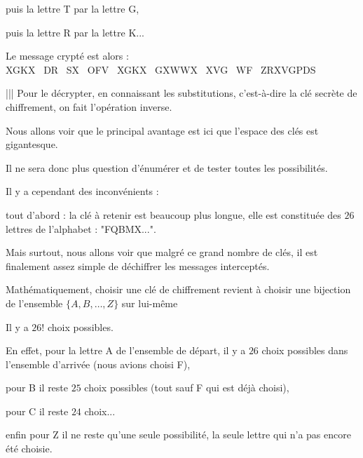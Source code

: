 puis la lettre T par la lettre G, 

puis la lettre R par la lettre K...

\change


Le message crypté est alors : \\
{XGKX \ DR \ SX \ OFV \ XGKX \ GXWWX \ XVG \ WF \ ZRXVGPDS}

\change

||| Pour le décrypter, en connaissant les substitutions, c'est-à-dire la clé secrète de chiffrement, on fait l'opération inverse.

\change

Nous allons voir que le principal avantage est ici que l'espace des clés est gigantesque.

Il ne sera donc plus question d'énumérer et de tester toutes les possibilités.


\change

Il y a cependant des inconvénients :

\change

tout d'abord : la clé à retenir est beaucoup plus longue, elle est constituée des $26$ lettres de l'alphabet : "FQBMX...".

\change

Mais surtout, nous allons voir que malgré ce grand nombre de clés, il est finalement assez simple de déchiffrer les messages interceptés.


\diapo

Mathématiquement, choisir une clé de chiffrement revient à choisir une bijection de
l'ensemble $\big\{ A,B,\ldots,Z \big\}$ sur lui-même

\change

Il y a $26!$ choix possibles. 

\change

En effet, pour la lettre A de l'ensemble de départ, il y a
$26$ choix possibles dans l'ensemble d'arrivée (nous avions choisi F), 

\change

pour B il reste $25$ choix possibles
(tout sauf F qui est déjà choisi), 

\change

pour C il reste $24$ choix...

\change

enfin pour Z il ne reste qu'une seule possibilité, la seule lettre qui n'a pas encore été choisie.

\change

